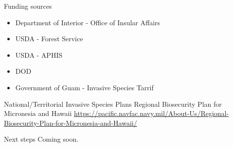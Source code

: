\documentclass[]{beamer}
\begin{document}
\begin{frame}{Funding sources}
	\begin{itemize}
	   \item Department of Interior - Office of Insular Affairs
	   \item USDA - Forest Service
	   \item USDA - APHIS
	   \item DOD
	   \item Government of Guam - Invasive Species Tarrif
	\end{itemize}		
\end{frame}

\begin{frame}{National/Territorial Invasive Species Plans}
	Regional Biosecurity Plan for Micronesia and Hawaii
   \url{https://pacific.navfac.navy.mil/About-Us/Regional-Biosecurity-Plan-for-Micronesia-and-Hawaii/}
\end{frame}
\begin{frame}{Next steps}
	Coming soon.
\end{frame}
\end{document}
